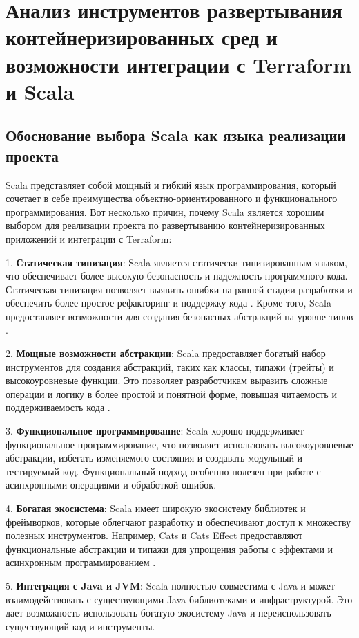 \chapter{Анализ инструментов развертывания контейнеризированных
сред и возможности интеграции с Terraform и Scala}
\label{chapter1}

\section{Обоснование выбора Scala как языка реализации проекта}

Scala представляет собой мощный и гибкий язык программирования, который сочетает
в себе преимущества объектно-ориентированного и функционального
программирования. Вот несколько причин, почему Scala является хорошим выбором
для реализации проекта по развертыванию контейнеризированных приложений и
интеграции с Terraform:

1. \textbf{Статическая типизация}: Scala является статически типизированным
языком, что обеспечивает более высокую безопасность и надежность
программного кода. Статическая типизация позволяет выявить ошибки
на ранней стадии разработки и обеспечить более простое рефакторинг
и поддержку кода \cite{pierce-types-2012-ru}. Кроме того, Scala предоставляет
возможности для создания безопасных абстракций на уровне типов \cite{moors2008safe}.

2. \textbf{Мощные возможности абстракции}: Scala предоставляет богатый
набор инструментов для создания абстракций, таких как классы,
типажи (трейты) и высокоуровневые функции. Это позволяет разработчикам
выразить сложные операции и логику в более простой и понятной форме,
повышая читаемость и поддерживаемость кода \cite{moors2008safe}.

3. \textbf{Функциональное программирование}: Scala хорошо поддерживает
функциональное программирование, что позволяет использовать
высокоуровневые абстракции, избегать изменяемого состояния и
создавать модульный и тестируемый код. Функциональный подход
особенно полезен при работе с асинхронными операциями и обработкой ошибок.

4. \textbf{Богатая экосистема}: Scala имеет широкую экосистему библиотек
и фреймворков, которые облегчают разработку и обеспечивают доступ
к множеству полезных инструментов. Например, Cats и Cats Effect
предоставляют функциональные абстракции и типажи для упрощения
работы с эффектами и асинхронным программированием
\cite{cats-effect, cats}.

5. \textbf{Интеграция с Java и JVM}: Scala полностью совместима с Java
и может взаимодействовать с существующими Java-библиотеками и
инфраструктурой. Это дает возможность использовать богатую экосистему
Java и переиспользовать существующий код и инструменты.

